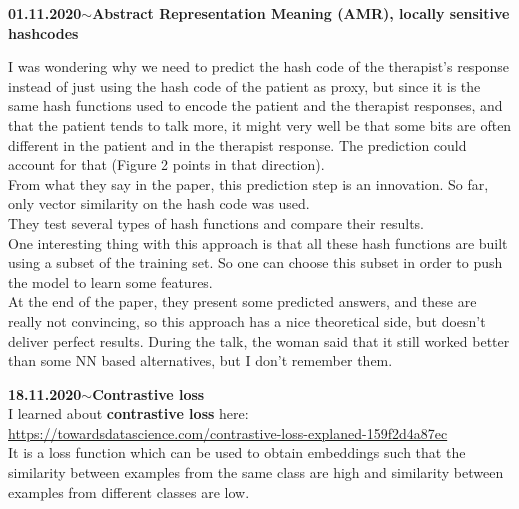 \documentclass[11pt,a4paper]{article}
\newenvironment{loggentry}[2]%
{\noindent\textbf{#1}\hspace{1cm}$\mathbf{\sim}$\text{ }\textbf{#2}\\}{\vspace{0.5cm}}
\begin{document}
\begin{loggentry}{01.11.2020}{Abstract Representation Meaning (AMR), locally sensitive hashcodes}
\begin{enumerate}
\end{enumerate}
I was wondering why we need to predict the hash code of the therapist's response instead of just using the hash code of the patient as proxy, but since it is the same hash functions used to encode the patient and the therapist responses, and that the patient tends to talk more, it might very well be that some bits are often different in the patient and in the therapist response. The prediction could account for that (Figure 2 points in that direction).\\
From what they say in the paper, this prediction step is an innovation. So far, only vector similarity on the hash code was used.\\
They test several types of hash functions and compare their results.\\
One interesting thing with this approach is that all these hash functions are built using a subset of the training set. So one can choose this subset in order to push the model to learn some features.\\
At the end of the paper, they present some predicted answers, and these are really not convincing, so this approach has a nice theoretical side, but doesn't deliver perfect results. During the talk, the woman said that it still worked better than some NN based alternatives, but I don't remember them.

\end{loggentry}


\begin{loggentry}{18.11.2020}{Contrastive loss}

I learned about \textbf{contrastive loss} here:\\
\url{https://towardsdatascience.com/contrastive-loss-explaned-159f2d4a87ec}\\
It is a loss function which can be used to obtain embeddings such that the similarity between examples from the same class are high and similarity between examples from different classes are low.

\end{loggentry}
\end{document}
